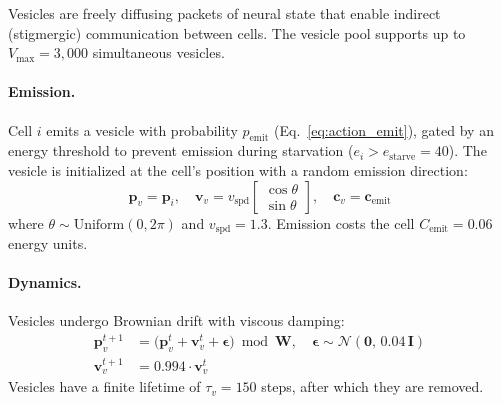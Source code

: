 \documentclass[10pt,twocolumn]{article}
\begin{document}
Vesicles are freely diffusing packets of neural state that enable indirect (stigmergic) communication between cells.
The vesicle pool supports up to $V_{\max} = 3{,}000$ simultaneous vesicles.

\paragraph{Emission.}
Cell $i$ emits a vesicle with probability $p_{\text{emit}}$ (Eq.~\ref{eq:action_emit}), gated by an energy threshold to prevent emission during starvation ($e_i > e_{\text{starve}} = 40$).
The vesicle is initialized at the cell's position with a random emission direction:
\begin{equation}
  \mathbf{p}_v = \mathbf{p}_i, \quad
  \mathbf{v}_v = v_{\text{spd}} \begin{bmatrix} \cos\theta \\ \sin\theta \end{bmatrix}, \quad
  \mathbf{c}_v = \mathbf{c}_{\text{emit}}
  \label{eq:vesicle_emit}
\end{equation}
where $\theta \sim \text{Uniform}(0, 2\pi)$ and $v_{\text{spd}} = 1.3$. Emission costs the cell $C_{\text{emit}} = 0.06$ energy units.

\paragraph{Dynamics.}
Vesicles undergo Brownian drift with viscous damping:
\begin{align}
  \mathbf{p}_v^{t+1} &= \big(\mathbf{p}_v^{t} + \mathbf{v}_v^{t} + \bm{\epsilon}\big) \bmod \mathbf{W}, \quad \bm{\epsilon} \sim \mathcal{N}(\mathbf{0},\, 0.04\, \mathbf{I}) \label{eq:vesicle_pos} \\
  \mathbf{v}_v^{t+1} &= 0.994 \cdot \mathbf{v}_v^{t} \label{eq:vesicle_vel}
\end{align}
Vesicles have a finite lifetime of $\tau_v = 150$ steps, after which they are removed.
\end{document}
